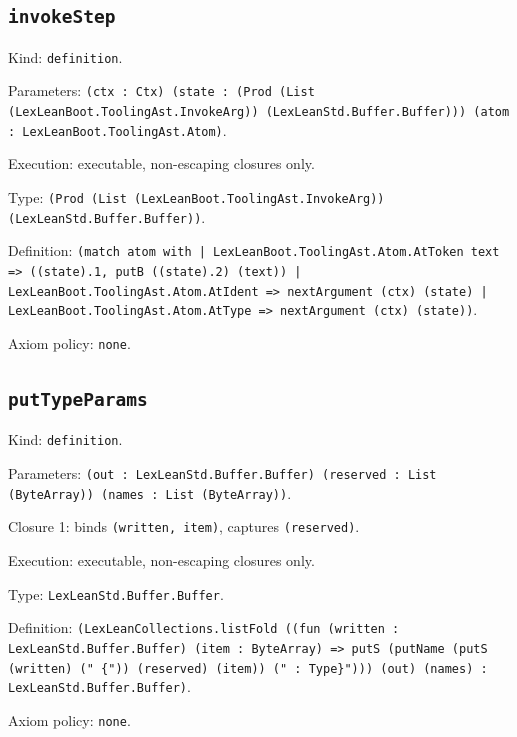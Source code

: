 \documentclass[11pt]{article}
\begin{document}
\subsection*{\texttt{invokeStep}}
\noindent Kind: \texttt{definition}.\par
\noindent Parameters: \texttt{(ctx : Ctx) (state : (Prod (List (LexLeanBoot.ToolingAst.InvokeArg)) (LexLeanStd.Buffer.Buffer))) (atom : LexLeanBoot.ToolingAst.Atom)}.\par
\noindent Execution: executable, non-escaping closures only.\par
\noindent Type: \texttt{(Prod (List (LexLeanBoot.ToolingAst.InvokeArg)) (LexLeanStd.Buffer.Buffer))}.\par
\noindent Definition: \texttt{(match atom with | LexLeanBoot.ToolingAst.Atom.AtToken text => ((state).1, putB ((state).2) (text)) | LexLeanBoot.ToolingAst.Atom.AtIdent => nextArgument (ctx) (state) | LexLeanBoot.ToolingAst.Atom.AtType => nextArgument (ctx) (state))}.\par
\noindent Axiom policy: \texttt{none}.\par
\subsection*{\texttt{putTypeParams}}
\noindent Kind: \texttt{definition}.\par
\noindent Parameters: \texttt{(out : LexLeanStd.Buffer.Buffer) (reserved : List (ByteArray)) (names : List (ByteArray))}.\par
\noindent Closure 1: binds \texttt{(written, item)}, captures \texttt{(reserved)}.\par
\noindent Execution: executable, non-escaping closures only.\par
\noindent Type: \texttt{LexLeanStd.Buffer.Buffer}.\par
\noindent Definition: \texttt{(LexLeanCollections.listFold ((fun (written : LexLeanStd.Buffer.Buffer) (item : ByteArray) => putS (putName (putS (written) (" \{")) (reserved) (item)) (" : Type\}"))) (out) (names) : LexLeanStd.Buffer.Buffer)}.\par
\noindent Axiom policy: \texttt{none}.\par
\end{document}
